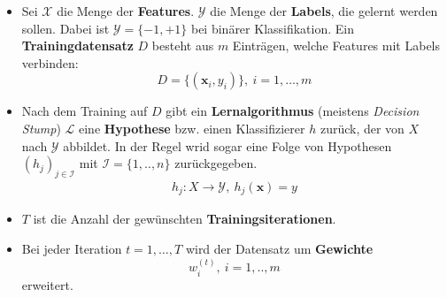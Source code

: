 \begin{itemize}
    \item Sei $\mathcal{X}$ die Menge der \textbf{Features}.
          $\mathcal{Y}$ die Menge der \textbf{Labels}, die gelernt werden sollen.
          Dabei ist $\mathcal{Y}=\{-1, +1\}$ bei binärer Klassifikation. Ein \textbf{Trainingdatensatz} $D$ besteht aus $m$ Einträgen,
          welche Features mit Labels verbinden:
          $$
              D=\{(\boldsymbol{x}_i, y_i)\},~i=1, \dots, m
          $$
    \item Nach dem Training auf $D$ gibt ein \textbf{Lernalgorithmus} (meistens \emph{Decision Stump}) $\mathcal{L}$ eine \textbf{Hypothese} bzw. einen Klassifizierer
          $h$ zurück, der von $X$ nach $\mathcal{Y}$ abbildet. In der Regel wrid sogar eine Folge von Hypothesen $(h_j)_{j\in\mathcal{I}}$ mit $\mathcal{I}=\{1,..,n\}$ zurückgegeben.
          \begin{align*}
              h_j:X \rightarrow \mathcal{Y},~h_j(\boldsymbol{x}) = y
          \end{align*}
    \item $T$ ist die Anzahl der gewünschten \textbf{Trainingsiterationen}.
    \item Bei jeder Iteration $t=1, \dots,T$ wird der Datensatz um \textbf{Gewichte} $$
              w_i^{(t)},~i=1,..,m
          $$ erweitert.
\end{itemize}
